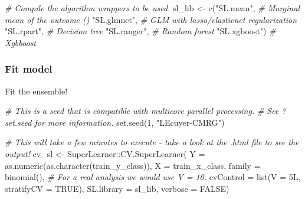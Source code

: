 \documentclass[
]{book}
\newenvironment{Shaded}{\begin{snugshade}}{\end{snugshade}}
\newcommand{\AttributeTok}[1]{\textcolor[rgb]{0.77,0.63,0.00}{#1}}
\newcommand{\CommentTok}[1]{\textcolor[rgb]{0.56,0.35,0.01}{\textit{#1}}}
\newcommand{\ConstantTok}[1]{\textcolor[rgb]{0.00,0.00,0.00}{#1}}
\newcommand{\DecValTok}[1]{\textcolor[rgb]{0.00,0.00,0.81}{#1}}
\newcommand{\FunctionTok}[1]{\textcolor[rgb]{0.00,0.00,0.00}{#1}}
\newcommand{\NormalTok}[1]{#1}
\newcommand{\OtherTok}[1]{\textcolor[rgb]{0.56,0.35,0.01}{#1}}
\newcommand{\SpecialCharTok}[1]{\textcolor[rgb]{0.00,0.00,0.00}{#1}}
\newcommand{\StringTok}[1]{\textcolor[rgb]{0.31,0.60,0.02}{#1}}
\begin{document}
\begin{Shaded}
\begin{Highlighting}[]
\CommentTok{\# Compile the algorithm wrappers to be used.}
\NormalTok{sl\_lib }\OtherTok{\textless{}{-}} \FunctionTok{c}\NormalTok{(}\StringTok{"SL.mean"}\NormalTok{, }\CommentTok{\# Marginal mean of the outcome () }
            \StringTok{"SL.glmnet"}\NormalTok{, }\CommentTok{\# GLM with lasso/elasticnet regularization }
            \StringTok{"SL.rpart"}\NormalTok{, }\CommentTok{\# Decision tree }
            \StringTok{"SL.ranger"}\NormalTok{, }\CommentTok{\# Random forest  }
            \StringTok{"SL.xgboost"}\NormalTok{) }\CommentTok{\# Xgbboost }
\end{Highlighting}
\end{Shaded}

\hypertarget{fit-model}{%
\subsubsection{Fit model}\label{fit-model}}

Fit the ensemble!

\begin{Shaded}
\begin{Highlighting}[]
\CommentTok{\# This is a seed that is compatible with multicore parallel processing.}
\CommentTok{\# See ?set.seed for more information.}
\FunctionTok{set.seed}\NormalTok{(}\DecValTok{1}\NormalTok{, }\StringTok{"L\textquotesingle{}Ecuyer{-}CMRG"}\NormalTok{) }

\CommentTok{\# This will take a few minutes to execute {-} take a look at the .html file to see the output!}
\NormalTok{cv\_sl }\OtherTok{\textless{}{-}}\NormalTok{  SuperLearner}\SpecialCharTok{::}\FunctionTok{CV.SuperLearner}\NormalTok{(}
  \AttributeTok{Y =} \FunctionTok{as.numeric}\NormalTok{(}\FunctionTok{as.character}\NormalTok{(train\_y\_class)),}
  \AttributeTok{X =}\NormalTok{ train\_x\_class,}
  \AttributeTok{family =} \FunctionTok{binomial}\NormalTok{(),}
  \CommentTok{\# For a real analysis we would use V = 10.}
  \AttributeTok{cvControl =} \FunctionTok{list}\NormalTok{(}\AttributeTok{V =}\NormalTok{ 5L, }\AttributeTok{stratifyCV =} \ConstantTok{TRUE}\NormalTok{),}
  \AttributeTok{SL.library =}\NormalTok{ sl\_lib,}
  \AttributeTok{verbose =} \ConstantTok{FALSE}\NormalTok{)}
\end{Highlighting}
\end{Shaded}
\end{document}

